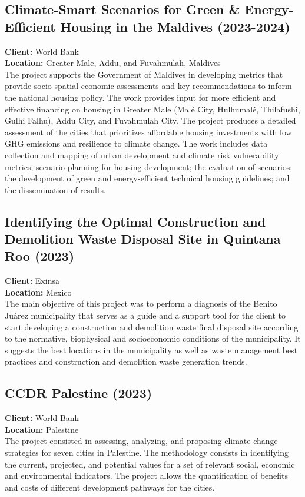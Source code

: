 \documentclass[
	a4paper,
	12pt,
	unnumberedsections,
]{CSSullivanBusinessReport}
\begin{document}
\subsection{Climate-Smart Scenarios for Green \& Energy-Efficient Housing in the Maldives (2023-2024)}
\textbf{Client:}  World Bank \\
\textbf{Location:}  Greater Male, Addu, and Fuvahmulah, Maldives \\[0.5em]
 The project supports the Government of Maldives in developing metrics that provide socio-spatial economic assessments and key recommendations to inform the national housing policy. The work provides input for more efficient and effective financing on housing in Greater Male (Malé City, Hulhumalé, Thilafushi, Gulhi Falhu), Addu City, and Fuvahmulah City. The project produces a detailed assessment of the cities that prioritizes affordable housing investments with low GHG emissions and resilience to climate change. The work includes data collection and mapping of urban development and climate risk vulnerability metrics; scenario planning for housing development; the evaluation of scenarios; the development of green and energy-efficient technical housing guidelines; and the dissemination of results.

\subsection{Identifying the Optimal Construction and Demolition Waste Disposal Site in Quintana Roo (2023)}
\textbf{Client:}  Exinsa \\
\textbf{Location:}  Mexico \\[0.5em]
 The main objective of this project was to perform a diagnosis of the Benito Juárez municipality that serves as a guide and a support tool for the client to start developing a construction and demolition waste final disposal site according to the normative, biophysical and socioeconomic conditions of the municipality. It suggests the best locations in the municipality as well as waste management best practices and construction and demolition waste generation trends.

\subsection{CCDR Palestine (2023)}
\textbf{Client:}  World Bank \\
\textbf{Location:}  Palestine \\[0.5em]
 The project consisted in assessing, analyzing, and proposing climate change strategies for seven cities in Palestine. The methodology consists in identifying the current, projected, and potential values for a set of relevant social, economic and environmental indicators. The project allows the quantification of benefits and costs of different development pathways for the cities.
\end{document}
